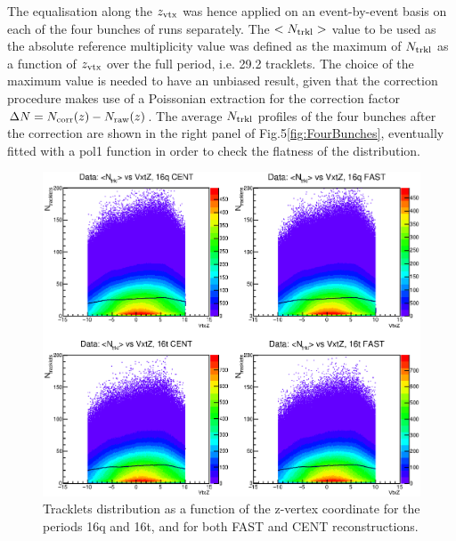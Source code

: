  The equalisation along the $z_{\rm vtx}$ was hence applied on an event-by-event basis on each of the four bunches of runs separately.
The $<N_{\rm trkl}>$ value to be used as the absolute reference multiplicity value was defined as the maximum of $N_{\rm trkl}$ as a function of $z_{\rm vtx}$ 
over the full period, i.e. 29.2 tracklets. The choice of the maximum value is needed to have an unbiased result, 
given that the correction procedure makes use
of a Poissonian extraction for the correction factor $\Delta N = N_{\rm corr}(z) - N_{\rm raw}(z)$. The average $N_{\rm trkl}$ profiles of the four bunches 
after the correction are shown in the right panel of Fig.5\ref{fig:FourBunches}, eventually fitted with a pol1 function in order
to check the flatness of the distribution.


\begin{figure}[h]
\centering
 \includegraphics[width=.7\textwidth]{FigCap6/NtrklVsVtxZ_Data.eps}
 \caption{Tracklets distribution as a function of the z-vertex coordinate for the periods 16q and 16t, and for both FAST and CENT reconstructions.}
 \label{fig:NtrklVsZ2D}
\end{figure}


